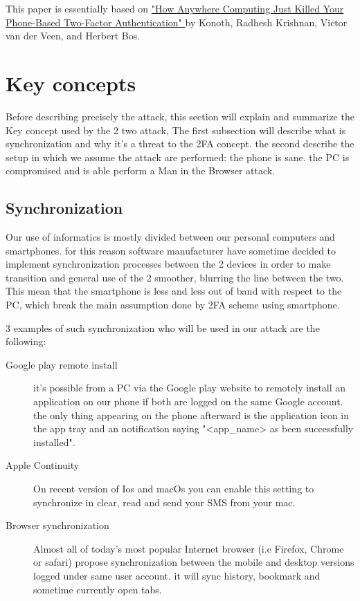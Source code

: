 \documentclass[11pt, a4paper,twocolumn]{article}
\begin{document}
This paper is essentially based on \href{http://fc16.ifca.ai/preproceedings/24_Konoth.pdf}{"How Anywhere Computing Just Killed Your Phone-Based Two-Factor Authentication" } by  Konoth, Radhesh Krishnan, Victor van der Veen, and Herbert Bos. \cite{Base}

\section{Key concepts}
Before describing precisely the attack, this section will explain and summarize the Key concept used by the 2 two attack,  The first subsection will describe what is synchronization and why it's a threat to the 2FA concept. the second describe the setup in which we assume the attack are performed: the phone is sane. the PC is compromised and is able perform a Man in the Browser attack.
\subsection{Synchronization}
Our use of informatics is mostly divided between our personal computers 
and smartphones. for this reason software manufacturer have sometime decided to implement synchronization processes between the 2 devices in order to make transition and general use of the 2 smoother, blurring the line between the two. This mean that the smartphone is less and less out of band with respect to the PC, which break the main assumption done by 2FA scheme using smartphone.

3 examples of such synchronization who will be used in our attack are the 
following:
\begin{description}
  \item[Google play remote install] it's possible from a PC via the Google play website to remotely install an application on our phone if both are logged on the same Google account. the only thing appearing on the phone afterward is the application icon in the app tray and an notification saying "<app\_name> as been successfully installed".
  
  \item[Apple Continuity] On recent version of Ios and macOs you can enable this setting to synchronize in clear, read and send your SMS from your mac.
  
  \item[Browser synchronization] Almost all of today's most popular Internet browser (i.e Firefox, Chrome or safari) propose synchronization between the mobile and desktop versions logged under same user account. it will sync history, bookmark and sometime currently open tabs.
\end{description}
\end{document}
